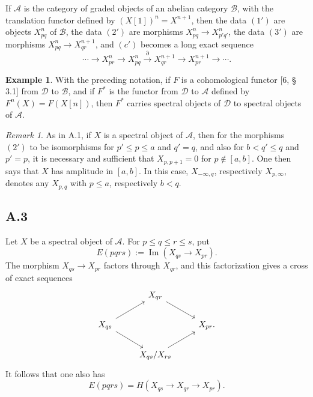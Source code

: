 \documentclass[11pt,a4paper]{article}
\theoremstyle{plain}
\theoremstyle{definition}
\newtheorem{example}[theorem]{Example}
\theoremstyle{remark}
\newtheorem{remark}[theorem]{Remark}
\newcommand{\cD}{\mathscr{D}}
\newcommand{\cA}{\mathscr{A}}
\newcommand{\cB}{\mathscr{B}}
\begin{document}
If $\cA$ is the category of graded objects of an abelian category $\cB$, with the translation functor defined by $(X[1])^n=X^{n+1}$, then the data $(1')$ are objects $X_{pq}^n$ of $\cB$, the data $(2')$ are morphisms $X_{pq}^n\to X_{p'q'}^n$, the data $(3')$ are morphisms $X_{pq}^n\to X_{qr}^{n+1}$, and $(c')$ becomes a long exact sequence
\[
\cdots\to X_{pr}^n\to X_{pq}^n\xrightarrow{\partial}X_{qr}^{n+1}\to X_{pr}^{n+1}\to\cdots.
\]

\begin{example}
With the preceding notation, if $F$ is a cohomological functor [6, \S\,3.1] from $\cD$ to $\cB$, and if $F^*$ is the functor from $\cD$ to $\cA$ defined by $F^n(X)=F(X[n])$, then $F^*$ carries spectral objects of $\cD$ to spectral objects of $\cA$.
\end{example}

\begin{remark}
As in A.1, if $X$ is a spectral object of $\cA$, then for the morphisms $(2')$ to be isomorphisms for $p'\leqslant p\leqslant a$ and $q'=q$, and also for $b<q'\leqslant q$ and $p'=p$, it is necessary and sufficient that $X_{p,p+1}=0$ for $p\notin[a,b]$. One then says that $X$ has amplitude in $[a,b]$. In this case, $X_{-\infty,q}$, respectively $X_{p,\infty}$, denotes any $X_{p,q}$ with $p\leqslant a$, respectively $b<q$.
\end{remark}

\subsection*{A.3}
Let $X$ be a spectral object of $\cA$. For $p\leqslant q\leqslant r\leqslant s$, put
\begin{equation}\label{eq:A.3.1}
E(pqrs):=\operatorname{Im}(X_{qs}\to X_{pr}).
\end{equation}
The morphism $X_{qs}\to X_{pr}$ factors through $X_{qr}$, and this factorization gives a cross of exact sequences
\[
\begin{tikzcd}
& X_{qr} \arrow[rd] \\
X_{qs} \arrow[ru] \arrow[rd] & & X_{pr}. \\
& X_{qs}/X_{rs} \arrow[ru]
\end{tikzcd}
\]
It follows that one also has
\begin{equation}\label{eq:A.3.2}
E(pqrs)=H(X_{qs}\to X_{qr}\to X_{pr}).
\end{equation}
\end{document}
